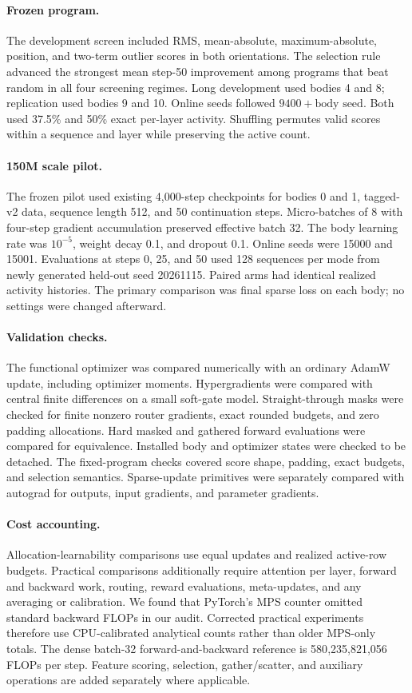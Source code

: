 \documentclass{article}
\begin{document}
\paragraph{Frozen program.}
The development screen included RMS, mean-absolute, maximum-absolute, position,
and two-term outlier scores in both orientations. The selection rule advanced
the strongest mean step-50 improvement among programs that beat random in all
four screening regimes. Long development used bodies 4 and 8; replication used
bodies 9 and 10. Online seeds followed $9400+\text{body seed}$. Both used
37.5\% and 50\% exact per-layer activity. Shuffling permutes valid scores within
a sequence and layer while preserving the active count.

\paragraph{150M scale pilot.}
The frozen pilot used existing 4{,}000-step checkpoints for bodies 0 and 1,
tagged-v2 data, sequence length 512, and 50 continuation steps. Micro-batches
of 8 with four-step gradient accumulation preserved effective batch 32. The
body learning rate was $10^{-5}$, weight decay 0.1, and dropout 0.1. Online
seeds were 15000 and 15001. Evaluations at steps 0, 25, and 50 used 128
sequences per mode from newly generated held-out seed 20261115. Paired arms
had identical realized activity histories. The primary comparison was final
sparse loss on each body; no settings were changed afterward.

\paragraph{Validation checks.}
The functional optimizer was compared numerically with an ordinary AdamW update,
including optimizer moments. Hypergradients were compared with central finite
differences on a small soft-gate model. Straight-through masks were checked for
finite nonzero router gradients, exact rounded budgets, and zero padding
allocations. Hard masked and gathered forward evaluations were compared for
equivalence. Installed body and optimizer states were checked to be detached.
The fixed-program checks covered score shape, padding, exact budgets, and
selection semantics. Sparse-update primitives were separately compared with
autograd for outputs, input gradients, and parameter gradients.

\paragraph{Cost accounting.}
Allocation-learnability comparisons use equal updates and realized active-row
budgets. Practical comparisons additionally require attention per layer,
forward and backward work, routing, reward evaluations, meta-updates, and any
averaging or calibration. We found that PyTorch's MPS counter omitted standard
backward FLOPs in our audit. Corrected practical experiments therefore use
CPU-calibrated analytical counts rather than older MPS-only totals. The dense
batch-32 forward-and-backward reference is 580{,}235{,}821{,}056 FLOPs per step.
Feature scoring, selection, gather/scatter, and auxiliary operations are added
separately where applicable.
\end{document}
